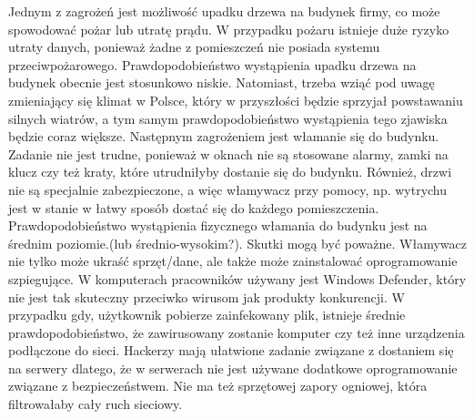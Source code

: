 Jednym z zagrożeń jest możliwość upadku drzewa na budynek firmy, co może spowodować pożar lub utratę prądu. W przypadku pożaru istnieje duże ryzyko utraty danych, ponieważ żadne z pomieszczeń nie posiada systemu przeciwpożarowego.  Prawdopodobieństwo wystąpienia upadku drzewa na budynek obecnie jest stosunkowo niskie. Natomiast, trzeba wziąć pod uwagę zmieniający się klimat w Polsce, który w przyszłości będzie sprzyjał powstawaniu silnych wiatrów, a tym samym prawdopodobieństwo wystąpienia tego zjawiska będzie coraz większe.
\newline Następnym zagrożeniem jest włamanie się do budynku. Zadanie nie jest trudne, ponieważ w oknach nie są stosowane alarmy, zamki na klucz czy też kraty, które utrudniłyby dostanie się do budynku. Również, drzwi nie są specjalnie zabezpieczone, a więc włamywacz przy pomocy, np. wytrychu jest w stanie w łatwy sposób dostać się do każdego pomieszczenia. Prawdopodobieństwo wystąpienia fizycznego włamania do budynku jest na średnim poziomie.(lub średnio-wysokim?). Skutki mogą być poważne. Włamywacz nie tylko może ukraść sprzęt/dane, ale także może zainstalować oprogramowanie szpiegujące.
\newline W komputerach pracowników używany jest Windows Defender, który nie jest tak skuteczny przeciwko wirusom jak produkty konkurencji. W przypadku gdy, użytkownik pobierze zainfekowany plik, istnieje średnie prawdopodobieństwo, że zawirusowany zostanie komputer czy też inne urządzenia podłączone do sieci.
\newline Hackerzy mają ułatwione zadanie związane z dostaniem się na serwery dlatego, że w serwerach nie jest używane dodatkowe oprogramowanie związane z bezpieczeństwem. Nie ma też sprzętowej zapory ogniowej, która filtrowałaby cały ruch sieciowy.	


